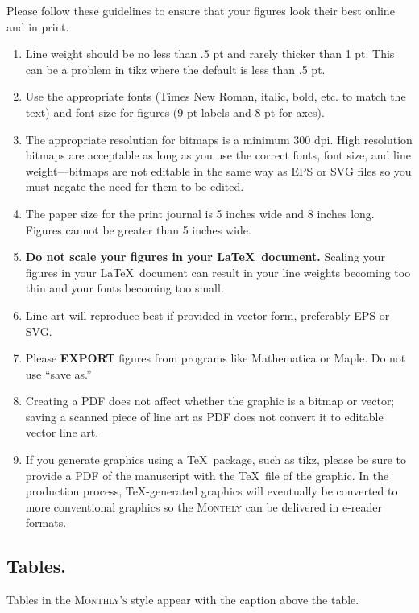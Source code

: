 \documentclass{article}
\theoremstyle{theorem}
\theoremstyle{definition}
\begin{document}
Please follow these guidelines to ensure that your figures look their best online and in print.
\begin{enumerate}
\item Line weight should be no less than .5 pt and rarely thicker than 1 pt. This can be a problem in tikz where the default is less than .5 pt.
\item  Use the appropriate fonts (Times New Roman, italic, bold, etc. to match the text) and font size for figures (9 pt labels and 8 pt for axes).
\item The appropriate resolution for bitmaps is a minimum 300 dpi. High resolution bitmaps are acceptable as long as you use the correct fonts, font size, and line weight---bitmaps are not editable in the same way as EPS or SVG files so you must negate the need for them to be edited.
\item  The paper size for the print journal is 5 inches wide and 8 inches long.  Figures cannot be greater than 5 inches wide.  
\item {\textbf{Do not scale your figures in your \LaTeX\ document.}} Scaling your figures in your \LaTeX\ document  can result in your line weights becoming too thin and your fonts becoming too small.
\item Line art will reproduce best if provided in vector form, preferably EPS or SVG.
\item Please \textbf{EXPORT} figures from programs like Mathematica or Maple. Do not use ``save as.''   
\item Creating a PDF does not affect whether the graphic is a bitmap or vector; saving a scanned piece of line art as PDF does not convert it to editable vector line art.
\item If you generate graphics using a \TeX\ package, such as tikz, please be sure to provide a PDF of the manuscript with the \TeX\ file of the graphic.  In the production process, \TeX-generated graphics will eventually be converted to more conventional graphics so the \textsc{Monthly} can be delivered in e-reader formats.
\end{enumerate}

\subsection{Tables.}
Tables in the \textsc{Monthly's} style appear with the caption above the table.
\end{document}
